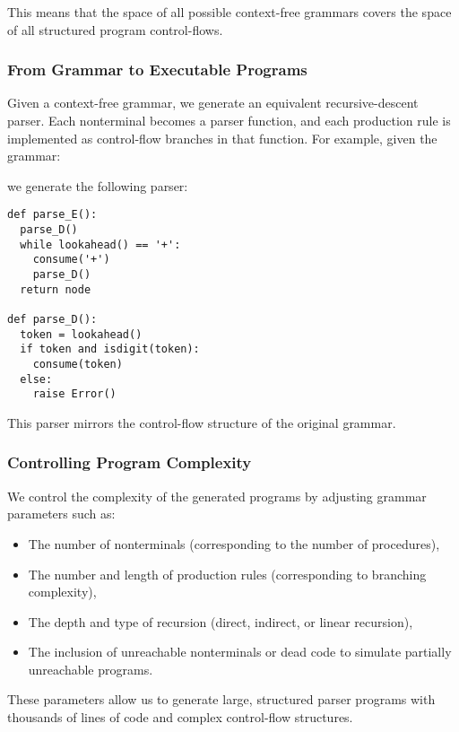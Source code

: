 \documentclass[conference,anonymous,review]{IEEEtran}
\def\[[#1\]]{\texttt{#1}}
\def\term#1{\texttt{'\textbf{#1}'}}
\def\nonterm#1{\textlangle\textnormal{\emph{#1}}\textrangle}
\def\expandsto{\(\rightarrow{}\)}
\begin{document}
This means that the space of all possible context-free grammars covers the space of all structured program control-flows.

\subsubsection{From Grammar to Executable Programs}

Given a context-free grammar, we generate an equivalent recursive-descent parser. Each nonterminal becomes a parser function, and each production rule is implemented as control-flow branches in that function. For example, given the grammar:


we generate the following parser:

\begin{lstlisting}[style=Python, escapechar=|,numbersep=2pt]
def parse_E():
  parse_D()
  while lookahead() == '+':
    consume('+')
    parse_D()
  return node

def parse_D():
  token = lookahead()
  if token and isdigit(token):
    consume(token)
  else:
    raise Error()
\end{lstlisting}

This parser mirrors the control-flow structure of the original grammar.

\subsubsection{Controlling Program Complexity}

We control the complexity of the generated programs by adjusting grammar parameters such as:
\begin{itemize}
    \item The number of nonterminals (corresponding to the number of procedures),
    \item The number and length of production rules (corresponding to branching complexity),
    \item The depth and type of recursion (direct, indirect, or linear recursion),
    \item The inclusion of unreachable nonterminals or dead code to simulate partially unreachable programs.
\end{itemize}

These parameters allow us to generate large, structured parser programs with thousands of lines of code and complex control-flow structures.
\end{document}
